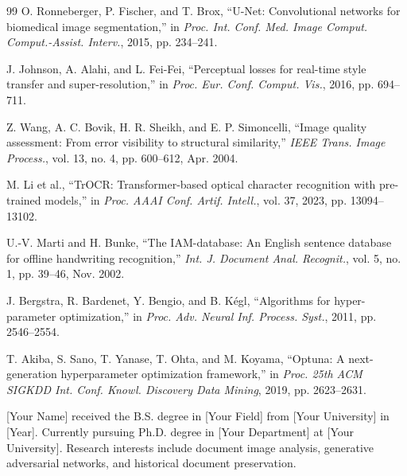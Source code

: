 \documentclass[journal]{IEEEtran}
\begin{document}
\begin{thebibliography}{99}
O. Ronneberger, P. Fischer, and T. Brox, ``U-Net: Convolutional networks for biomedical image segmentation,'' in \textit{Proc. Int. Conf. Med. Image Comput. Comput.-Assist. Interv.}, 2015, pp. 234--241.

J. Johnson, A. Alahi, and L. Fei-Fei, ``Perceptual losses for real-time style transfer and super-resolution,'' in \textit{Proc. Eur. Conf. Comput. Vis.}, 2016, pp. 694--711.

Z. Wang, A. C. Bovik, H. R. Sheikh, and E. P. Simoncelli, ``Image quality assessment: From error visibility to structural similarity,'' \textit{IEEE Trans. Image Process.}, vol. 13, no. 4, pp. 600--612, Apr. 2004.

M. Li et al., ``TrOCR: Transformer-based optical character recognition with pre-trained models,'' in \textit{Proc. AAAI Conf. Artif. Intell.}, vol. 37, 2023, pp. 13094--13102.

U.-V. Marti and H. Bunke, ``The IAM-database: An English sentence database for offline handwriting recognition,'' \textit{Int. J. Document Anal. Recognit.}, vol. 5, no. 1, pp. 39--46, Nov. 2002.

J. Bergstra, R. Bardenet, Y. Bengio, and B. Kégl, ``Algorithms for hyper-parameter optimization,'' in \textit{Proc. Adv. Neural Inf. Process. Syst.}, 2011, pp. 2546--2554.

T. Akiba, S. Sano, T. Yanase, T. Ohta, and M. Koyama, ``Optuna: A next-generation hyperparameter optimization framework,'' in \textit{Proc. 25th ACM SIGKDD Int. Conf. Knowl. Discovery Data Mining}, 2019, pp. 2623--2631.


\end{thebibliography}


\begin{IEEEbiographynophoto}{[Your Name]}
received the B.S. degree in [Your Field] from [Your University] in [Year]. Currently pursuing Ph.D. degree in [Your Department] at [Your University]. Research interests include document image analysis, generative adversarial networks, and historical document preservation.
\end{IEEEbiographynophoto}
\end{document}
